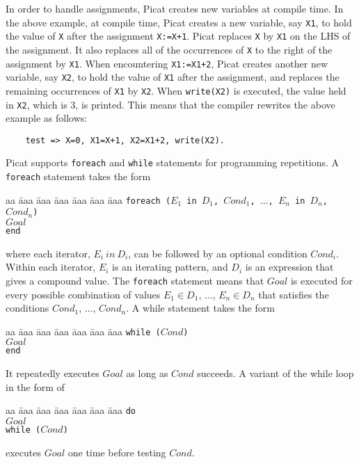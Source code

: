 In order to handle assignments, Picat creates new variables at compile time.  In the above example, at compile time, Picat creates a new variable, say \texttt{X1}, to hold the value of \texttt{X} after the assignment \verb-X:=X+1-. Picat replaces \texttt{X} by \texttt{X1} on the LHS of the assignment.  It also replaces all of the occurrences of \texttt{X} to the right of the assignment by \texttt{X1}.  When encountering \verb-X1:=X1+2-, Picat creates another new variable, say \texttt{X2}, to hold the value of \texttt{X1} after the assignment, and replaces the remaining occurrences of \texttt{X1} by \texttt{X2}. When \texttt{write(X2)} is executed, the value held in \texttt{X2}, which is 3, is printed.  This means that the compiler rewrites the above example as follows:
\begin{verbatim}
    test => X=0, X1=X+1, X2=X1+2, write(X2).
\end{verbatim}

Picat supports \texttt{foreach} and \texttt{while} statements for programming repetitions. A \texttt{foreach} statement takes the form
\begin{tabbing}
aa \= aaa \= aaa \= aaa \= aaa \= aaa \= aaa \kill
\> \texttt{foreach ($E_1$ in $D_1$, $Cond_1$, $\ldots$, $E_n$ in $D_n$, $Cond_n$)}  \\
\> \> $Goal$ \\
\>  \texttt{end} 
\end{tabbing}
where each iterator, $E_i\ in\ D_i$, can be followed by an optional condition $Cond_i$.  Within each iterator, $E_i$ is an iterating pattern, and $D_i$ is an expression that gives a compound value. The \texttt{foreach} statement means that $Goal$ is executed for every possible combination of values $E_1 \in D_1$, $\ldots$, $E_n \in D_n$ that satisfies the conditions \texttt{$Cond_1$}, $\ldots$, \texttt{$Cond_n$}. A while statement takes the form 
\begin{tabbing}
aa \= aaa \= aaa \= aaa \= aaa \= aaa \= aaa \kill
\> \texttt{while ($Cond$)} \\
\> \> $Goal$  \\
\>  \texttt{end}
\end{tabbing} 
It repeatedly executes $Goal$ as long as $Cond$ succeeds. A variant of the while loop in the form of 
\begin{tabbing}
aa \= aaa \= aaa \= aaa \= aaa \= aaa \= aaa \kill
\> \texttt{do} \\
\> \> $Goal$  \\
\>  \texttt{while ($Cond$)}
\end{tabbing}
executes $Goal$ one time before testing $Cond$.

